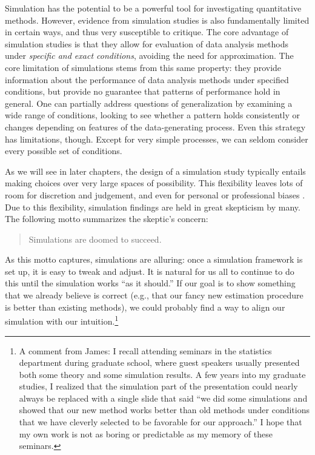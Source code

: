 \documentclass[
]{book}
\begin{document}
Simulation has the potential to be a powerful tool for investigating quantitative methods.
However, evidence from simulation studies is also fundamentally limited in certain ways, and thus very susceptible to critique.
The core advantage of simulation studies is that they allow for evaluation of data analysis methods under \emph{specific and exact conditions}, avoiding the need for approximation.
The core limitation of simulations stems from this same property: they provide information about the performance of data analysis methods under specified conditions, but provide no guarantee that patterns of performance hold in general.
One can partially address questions of generalization by examining a wide range of conditions, looking to see whether a pattern holds consistently or changes depending on features of the data-generating process.
Even this strategy has limitations, though.
Except for very simple processes, we can seldom consider every possible set of conditions.

As we will see in later chapters, the design of a simulation study typically entails making choices over very large spaces of possibility.
This flexibility leaves lots of room for discretion and judgement, and even for personal or professional biases \citep{boulesteix2020Replicationa}.
Due to this flexibility, simulation findings are held in great skepticism by many.
The following motto summarizes the skeptic's concern:

\begin{quote}
Simulations are doomed to succeed.
\end{quote}

As this motto captures, simulations are alluring: once a simulation framework is set up, it is easy to tweak and adjust.
It is natural for us all to continue to do this until the simulation works ``as it should.''
If our goal is to show something that we already believe is correct (e.g., that our fancy new estimation procedure is better than existing methods), we could probably find a way to align our simulation with our intuition.\footnote{A comment from James: I recall attending seminars in the statistics department during graduate school, where guest speakers usually presented both some theory and some simulation results. A few years into my graduate studies, I realized that the simulation part of the presentation could nearly always be replaced with a single slide that said ``we did some simulations and showed that our new method works better than old methods under conditions that we have cleverly selected to be favorable for our approach.'' I hope that my own work is not as boring or predictable as my memory of these seminars.}
\end{document}
